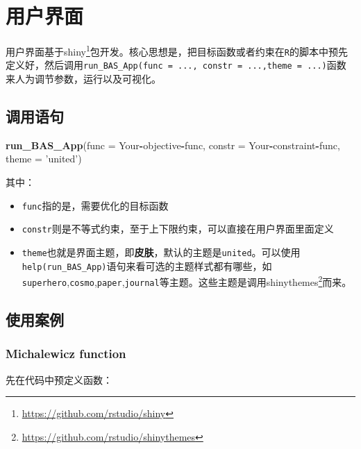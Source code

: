 \documentclass[]{ctexbook}
\newenvironment{Shaded}{\begin{snugshade}}{\end{snugshade}}
\newcommand{\KeywordTok}[1]{\textcolor[rgb]{0.13,0.29,0.53}{\textbf{#1}}}
\newcommand{\DataTypeTok}[1]{\textcolor[rgb]{0.13,0.29,0.53}{#1}}
\newcommand{\StringTok}[1]{\textcolor[rgb]{0.31,0.60,0.02}{#1}}
\newcommand{\OperatorTok}[1]{\textcolor[rgb]{0.81,0.36,0.00}{\textbf{#1}}}
\newcommand{\NormalTok}[1]{#1}
\renewcommand{\href}[2]{#2\footnote{\url{#1}}}
\theoremstyle{definition}
\theoremstyle{definition}
\theoremstyle{definition}
\theoremstyle{remark}
\begin{document}
\chapter{用户界面}\label{interface}

用户界面基于\href{https://github.com/rstudio/shiny}{shiny}包开发。核心思想是，把目标函数或者约束在\texttt{R}的脚本中预先定义好，然后调用\texttt{run\_BAS\_App(func\ =\ ...,\ constr\ =\ ...,theme\ =\ ...)}函数来人为调节参数，运行以及可视化。

\section{调用语句}

\begin{Shaded}
\begin{Highlighting}[]
\KeywordTok{run_BAS_App}\NormalTok{(}\DataTypeTok{func =}\NormalTok{ Your}\OperatorTok{-}\NormalTok{objective}\OperatorTok{-}\NormalTok{func,}
            \DataTypeTok{constr =}\NormalTok{ Your}\OperatorTok{-}\NormalTok{constraint}\OperatorTok{-}\NormalTok{func,}
            \DataTypeTok{theme =} \StringTok{'united'}\NormalTok{)}
\end{Highlighting}
\end{Shaded}

其中：

\begin{itemize}
\item
  \texttt{func}指的是，需要优化的目标函数
\item
  \texttt{constr}则是不等式约束，至于上下限约束，可以直接在用户界面里面定义
\item
  \texttt{theme}也就是界面主题，即\textbf{皮肤}，默认的主题是\texttt{united}。可以使用\texttt{help(run\_BAS\_App)}语句来看可选的主题样式都有哪些，如\texttt{superhero},\texttt{cosmo},\texttt{paper},\texttt{journal}等主题。这些主题是调用\href{https://github.com/rstudio/shinythemes}{shinythemes}而来。
\end{itemize}

\section{使用案例}

\subsection{Michalewicz function}\label{michalewicz-function-2}

先在代码中预定义函数：
\end{document}
